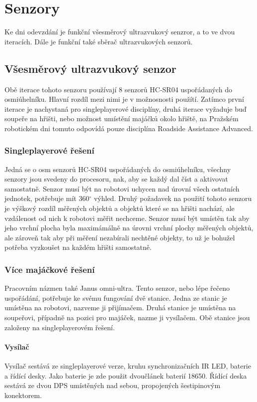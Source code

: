 \chapter{Senzory}
Ke dni odevzdání je funkční všesměrový ultrazvukový senzror, a to ve dvou iteracích.
Dále je funkční také sběrač ultrazvukových senzorů.

\section{Všesměrový ultrazvukový senzor}
Obě iterace tohoto senzoru používají 8 senzorů HC-SR04 uspořádaných do osmiúhelníku.
Hlavní rozdíl mezi nimi je v možnosnosti použítí.
Zatímco první iterace je nachystaná pro singleplayerové disciplíny, druhá iterace vyžaduje buď soupeře na hřišti, nebo možnost umístění majáčků okolo hřiště, na Pražském robotickém dni tomuto odpovídá pouze disciplína Roadside Assistance Advanced.

\subsection{Singleplayerové řešení}
Jedná se o osm senzorů HC-SR04 uspořádaných do osmiúhelníku, všechny senzory jsou svedeny do procesoru, nak, aby se každý dal číst a aktivovat samostatně.
Senzor musí být na robotovi uchycen nad úrovní všech ostatních jednotek, potřebuje mít 360$^{\circ}$ výhled.
Druhý požadavek na použití tohoto senzoru je výškový rozdíl měřených objektů a objektů které se na hřišti nachází, ale vzdálenost od nich k robotovi měřit nechceme.
Senzor musí být umístěn tak aby jeho vrchní plocha byla maximámálně na úrovni vrchní plochy měřených objektů, ale zároveň tak aby při měření nezabírali nechtěné objekty, to už je bohužel potřeba vyzkoušet na každém hřišti samostatně.

\subsection{Více majáčkové řešení}
Pracovním názmen také Janus omni-ultra.
Tento senzor, nebo lépe řečeno uspořádání, potřebuje ke svému fungování dvě stanice.
Jedna ze stanic je umístěna na robotovi, nazveme ji přijímačem.
Druhá stanice je umístěna na soupeřovi, případně na pozici pro majáček, nazme ji vysílačem.
Obě stanice jsou založeny na singleplayerovém řešení.

\subsubsection{Vysílač}
Vysílač sestává ze singleplayerové verze, kruhu synchronizačních IR LED, baterie a řídící desky.
Jako baterie je zde použit dvoučlánek baterií 18650.
Řídící deska sestává ze dvou DPS umístěných nad sebou, propojených šestipinovým konektorem.

